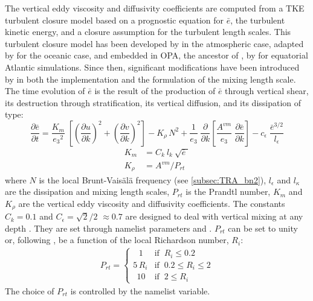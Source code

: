 \documentclass[../main/NEMO_manual]{subfiles}
\begin{document}
The vertical eddy viscosity and diffusivity coefficients are computed from a TKE turbulent closure model based on
a prognostic equation for $\bar{e}$, the turbulent kinetic energy,
and a closure assumption for the turbulent length scales.
This turbulent closure model has been developed by \citet{bougeault.lacarrere_MWR89} in the atmospheric case,
adapted by \citet{gaspar.gregoris.ea_JGR90} for the oceanic case, and embedded in OPA, the ancestor of \NEMO,
by \citet{blanke.delecluse_JPO93} for equatorial Atlantic simulations.
Since then, significant modifications have been introduced by \citet{madec.delecluse.ea_NPM98} in both the implementation and
the formulation of the mixing length scale.
The time evolution of $\bar{e}$ is the result of the production of $\bar{e}$ through vertical shear,
its destruction through stratification, its vertical diffusion, and its dissipation of \citet{kolmogorov_IANS42} type:
\begin{equation}
  \label{eq:ZDF_tke_e}
  \frac{\partial \bar{e}}{\partial t} =
  \frac{K_m}{{e_3}^2 }\;\left[ {\left( {\frac{\partial u}{\partial k}} \right)^2
      +\left( {\frac{\partial v}{\partial k}} \right)^2} \right]
  -K_\rho\,N^2
  +\frac{1}{e_3}	\;\frac{\partial }{\partial k}\left[ {\frac{A^{vm}}{e_3 }
      \;\frac{\partial \bar{e}}{\partial k}} \right]
  - c_\epsilon \;\frac{\bar {e}^{3/2}}{l_\epsilon }
\end{equation}
\[
  \begin{split}
    K_m &= C_k\  l_k\  \sqrt {\bar{e}\; }  	\\
    K_\rho &= A^{vm} / P_{rt}
  \end{split}
\]
where $N$ is the local Brunt-Vais\"{a}l\"{a} frequency (see \autoref{subsec:TRA_bn2}),
$l_{\epsilon }$ and $l_{\kappa }$ are the dissipation and mixing length scales,
$P_{rt}$ is the Prandtl number, $K_m$ and $K_\rho$ are the vertical eddy viscosity and diffusivity coefficients.
The constants $C_k =  0.1$ and $C_\epsilon = \sqrt {2} /2$ $\approx 0.7$ are designed to deal with
vertical mixing at any depth \citep{gaspar.gregoris.ea_JGR90}.
They are set through namelist parameters  and .
$P_{rt}$ can be set to unity or, following \citet{blanke.delecluse_JPO93}, be a function of the local Richardson number, $R_i$:
\begin{align*}
  P_{rt} =
  \begin{cases}
    \ \ \ 1 &      \text{if $\ R_i \leq 0.2$} 	\\
    5\,R_i &      \text{if $\ 0.2 \leq R_i \leq 2$} 	\\
    \ \ 10 &      \text{if $\ 2 \leq R_i$}
  \end{cases}
\end{align*}
The choice of $P_{rt}$ is controlled by the  namelist variable.
\end{document}
